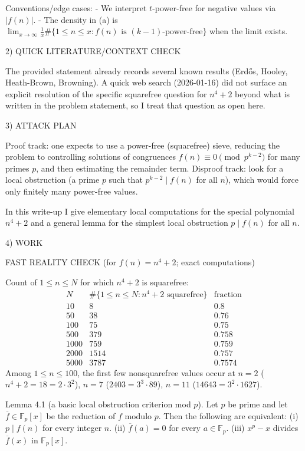 Conventions/edge cases:
- We interpret $t$-power-free for negative values via $|f(n)|$.
- The density in (a) is $\lim_{x\to\infty}\frac1x\#\{1\le n\le x: f(n)\text{ is }(k-1)\text{-power-free}\}$ when the limit exists.

2) QUICK LITERATURE/CONTEXT CHECK

The provided statement already records several known results (Erd\H{o}s, Hooley, Heath-Brown, Browning).
A quick web search (2026-01-16) did not surface an explicit resolution of the specific squarefree question for $n^4+2$ beyond what is written in the problem statement, so I treat that question as open here.

3) ATTACK PLAN

Proof track: one expects to use a power-free (squarefree) sieve, reducing the problem to controlling solutions of congruences $f(n)\equiv 0\pmod{p^{k-2}}$ for many primes $p$, and then estimating the remainder term.
Disproof track: look for a local obstruction (a prime $p$ such that $p^{k-2}\mid f(n)$ for all $n$), which would force only finitely many power-free values.

In this write-up I give elementary local computations for the special polynomial $n^4+2$ and a general lemma for the simplest local obstruction $p\mid f(n)$ for all $n$.

4) WORK

FAST REALITY CHECK (for $f(n)=n^4+2$; exact computations)

Count of $1\le n\le N$ for which $n^4+2$ is squarefree:
\[
\begin{array}{c|c|c}
N & \#\{1\le n\le N: n^4+2\text{ squarefree}\} & \text{fraction}\\\hline
10 & 8 & 0.8\\
50 & 38 & 0.76\\
100 & 75 & 0.75\\
500 & 379 & 0.758\\
1000 & 759 & 0.759\\
2000 & 1514 & 0.757\\
5000 & 3787 & 0.7574
\end{array}
\]
Among $1\le n\le 100$, the first few nonsquarefree values occur at
$n=2$ ($n^4+2=18=2\cdot 3^2$), $n=7$ ($2403=3^3\cdot 89$), $n=11$ ($14643=3^2\cdot 1627$).

Lemma 4.1 (a basic local obstruction criterion mod $p$).
Let $p$ be prime and let $\overline f\in\mathbb F_p[x]$ be the reduction of $f$ modulo $p$.
Then the following are equivalent:
(i) $p\mid f(n)$ for every integer $n$.
(ii) $\overline f(a)=0$ for every $a\in\mathbb F_p$.
(iii) $x^p-x$ divides $\overline f(x)$ in $\mathbb F_p[x]$.

